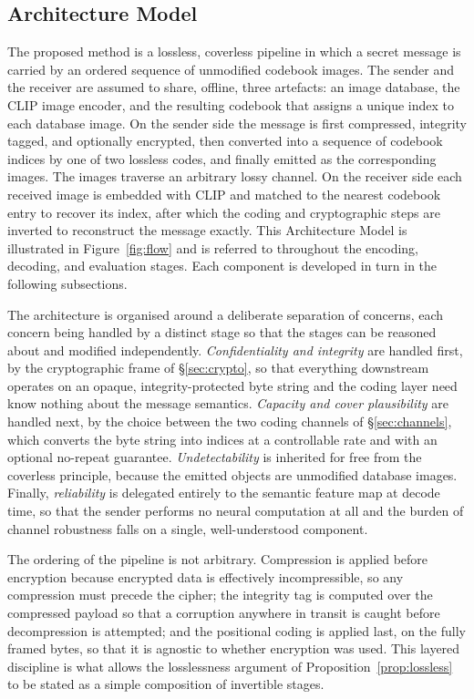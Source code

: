 \documentclass[10pt,a4paper]{article}
\theoremstyle{definition}
\begin{document}
\subsection{Architecture Model}\label{sec:architecture}
The proposed method is a lossless, coverless pipeline in which a secret message is
carried by an ordered sequence of unmodified codebook images. The sender and the
receiver are assumed to share, offline, three artefacts: an image database, the
CLIP image encoder, and the resulting codebook that assigns a unique index to each
database image. On the sender side the message is first compressed, integrity
tagged, and optionally encrypted, then converted into a sequence of codebook
indices by one of two lossless codes, and finally emitted as the corresponding
images. The images traverse an arbitrary lossy channel. On the receiver side each
received image is embedded with CLIP and matched to the nearest codebook entry to
recover its index, after which the coding and cryptographic steps are inverted to
reconstruct the message exactly. This Architecture Model is illustrated in
Figure~\ref{fig:flow} and is referred to throughout the encoding, decoding, and evaluation
stages. Each component is developed in turn in the following subsections.

The architecture is organised around a deliberate separation of concerns, each
concern being handled by a distinct stage so that the stages can be reasoned about
and modified independently. \emph{Confidentiality and integrity} are handled first,
by the cryptographic frame of \S\ref{sec:crypto}, so that everything downstream
operates on an opaque, integrity-protected byte string and the coding layer need
know nothing about the message semantics. \emph{Capacity and cover plausibility}
are handled next, by the choice between the two coding channels of
\S\ref{sec:channels}, which converts the byte string into indices at a controllable
rate and with an optional no-repeat guarantee. \emph{Undetectability} is inherited
for free from the coverless principle, because the emitted objects are unmodified
database images. Finally, \emph{reliability} is delegated entirely to the semantic
feature map at decode time, so that the sender performs no neural computation at all
and the burden of channel robustness falls on a single, well-understood component.

The ordering of the pipeline is not arbitrary. Compression is applied before
encryption because encrypted data is effectively incompressible, so any compression
must precede the cipher; the integrity tag is computed over the compressed payload
so that a corruption anywhere in transit is caught before decompression is
attempted; and the positional coding is applied last, on the fully framed bytes, so
that it is agnostic to whether encryption was used. This layered discipline is what
allows the losslessness argument of Proposition~\ref{prop:lossless} to be stated as
a simple composition of invertible stages.
\end{document}
